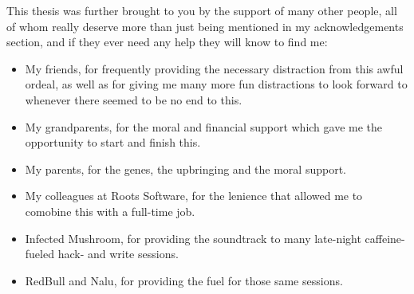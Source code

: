   This thesis was further brought to you by the support of many other people,
  all of whom really deserve more than just being mentioned in my
  acknowledgements section, and if they ever need any help they will know to find
  me:
  \begin{itemize}
   \item My friends, for frequently providing the necessary distraction from this awful ordeal, as well as for giving me many more fun distractions to look forward to whenever there seemed to be no end to this.
   \item My grandparents, for the moral and financial support which gave me the opportunity to start and finish this.%
   \item My parents, for the genes, the upbringing and the moral support.%
   \item My colleagues at Roots Software, for the lenience that allowed me to comobine this with a full-time job.%
   \item Infected Mushroom, for providing the soundtrack to many late-night caffeine-fueled hack- and write sessions.
   \item RedBull and Nalu, for providing the fuel for those same sessions.
  \end{itemize}

